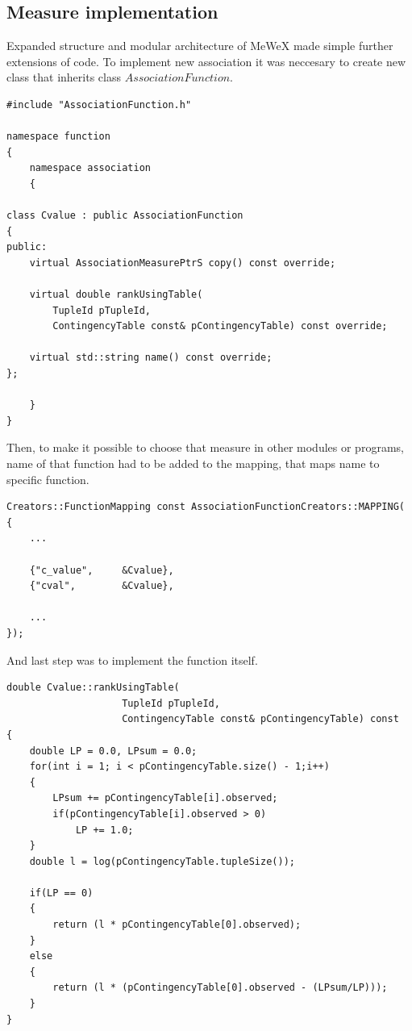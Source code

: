 \subsection{Measure implementation}
Expanded structure and modular architecture of MeWeX made simple further extensions of code. To implement new association 
it was neccesary to create new class that inherits class \(AssociationFunction\).
\begin{lstlisting}
#include "AssociationFunction.h"

namespace function
{
    namespace association
    {

class Cvalue : public AssociationFunction
{
public:
    virtual AssociationMeasurePtrS copy() const override;

    virtual double rankUsingTable(
        TupleId pTupleId,
        ContingencyTable const& pContingencyTable) const override;

    virtual std::string	name() const override;
};

    }
}
\end{lstlisting}
Then, to make it possible to choose that measure in other modules or programs, name of that function had to be added to the mapping,
that maps name to specific function.
\begin{lstlisting}
Creators::FunctionMapping const AssociationFunctionCreators::MAPPING(
{
    ...

    {"c_value",     &Cvalue},
    {"cval",        &Cvalue},

    ...
});
\end{lstlisting}
And last step was to implement the function itself.
\begin{lstlisting}
double Cvalue::rankUsingTable(
                    TupleId pTupleId, 
                    ContingencyTable const& pContingencyTable) const
{
    double LP = 0.0, LPsum = 0.0;
    for(int i = 1; i < pContingencyTable.size() - 1;i++)
    {
        LPsum += pContingencyTable[i].observed;
        if(pContingencyTable[i].observed > 0)
            LP += 1.0;
    }
    double l = log(pContingencyTable.tupleSize());

    if(LP == 0)
    {
        return (l * pContingencyTable[0].observed);
    }
    else
    {
        return (l * (pContingencyTable[0].observed - (LPsum/LP)));
    }
}
\end{lstlisting}

